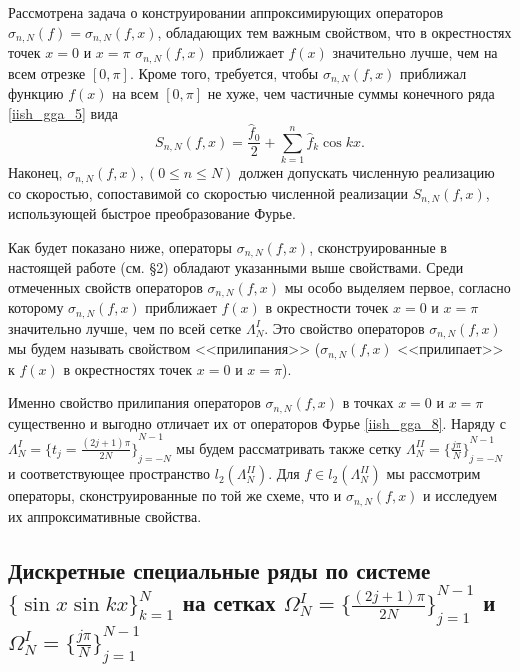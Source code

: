Рассмотрена задача о конструировании аппроксимирующих операторов $\sigma_{n,N}(f)=\sigma_{n,N}(f,x)$, обладающих тем важным свойством, что в окрестностях точек $x = 0$ и $x = \pi$ $\sigma_{n,N}(f,x)$ приближает $f(x)$ значительно лучше, чем на всем отрезке $[0,\pi]$. Кроме того, требуется, чтобы $\sigma_{n,N}(f,x)$ приближал функцию $f(x)$ на всем $[0,\pi]$ не хуже, чем частичные суммы конечного ряда \eqref{iish_gga_5} вида
\begin{equation}
S_{n,N}(f,x) = \frac{\hat{f}_0}{2} + \sum\limits_{k=1}^{n} \hat{f}_k \cos kx. \label{iish_gga_8}
\end{equation}
Наконец, $\sigma_{n,N}(f,x), (0 \leq n \leq N)$ должен допускать численную реализацию со скоростью, сопоставимой со скоростью численной реализации $S_{n,N}(f,x)$, использующей быстрое преобразование Фурье.

Как будет показано ниже, операторы $\sigma_{n,N}(f,x)$, сконструированные в настоящей работе (см. \S2) обладают указанными выше свойствами. Среди отмеченных свойств операторов $\sigma_{n,N}(f,x)$ мы особо выделяем первое, согласно которому $\sigma_{n,N}(f,x)$ приближает $f(x)$ в окрестности точек $x=0$ и $x=\pi$ значительно лучше, чем по всей сетке $\Lambda^I_N$. Это свойство операторов $\sigma_{n,N}(f,x)$ мы будем называть свойством <<прилипания>> ($\sigma_{n,N}(f,x)$ <<прилипает>> к $f(x)$ в окрестностях точек $x=0$ и $x=\pi$).

Именно свойство прилипания операторов $\sigma_{n,N}(f,x)$ в точках $x=0$ и $x=\pi$ существенно и выгодно отличает их от операторов Фурье \eqref{iish_gga_8}.
Наряду с $\Lambda^I_N = { \{ t_j = \frac{(2j+1)\pi}{2N} \} }_{j=-N}^{N-1}$ мы будем рассматривать также сетку $\Lambda^{II}_N = { \{\frac{j\pi}{N} \} }_{j=-N}^{N-1}$ и соответствующее пространство $l_2(\Lambda^{II}_{N})$. Для $f \in l_2(\Lambda^{II}_{N})$ мы рассмотрим операторы, сконструированные по той же схеме, что и $\sigma_{n,N}(f,x)$ и исследуем их аппроксимативные свойства.

\subsection{Дискретные специальные ряды по системе ${\{\sin x \sin kx\}}_{k=1}^{N}$ на сетках $\Omega^I_N = { \{ \frac{(2j+1)\pi}{2N} \} }_{j=1}^{N-1}$ и $\Omega^I_N = { \{ \frac{j\pi}{N} \} }_{j=1}^{N-1}$}

